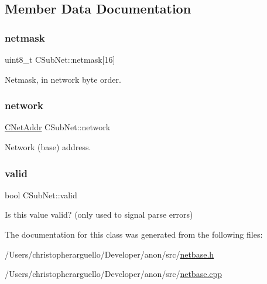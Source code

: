 \subsection{Member Data Documentation}
\mbox{\label{class_c_sub_net_a7ba6fc57a4ddcddfa3f3355cc3e56adc}} 
\subsubsection{\texorpdfstring{netmask}{netmask}}
{\footnotesize\ttfamily uint8\+\_\+t C\+Sub\+Net\+::netmask\mbox{[}16\mbox{]}\hspace{0.3cm}{\ttfamily [protected]}}



Netmask, in network byte order. 

\mbox{\label{class_c_sub_net_a17c8e899bfed76a371c833fb4cd679c9}} 
\subsubsection{\texorpdfstring{network}{network}}
{\footnotesize\ttfamily \mbox{\hyperlink{class_c_net_addr}{C\+Net\+Addr}} C\+Sub\+Net\+::network\hspace{0.3cm}{\ttfamily [protected]}}



Network (base) address. 

\mbox{\label{class_c_sub_net_a01fbc9843041de802baeaf4d6e4bbcc5}} 
\subsubsection{\texorpdfstring{valid}{valid}}
{\footnotesize\ttfamily bool C\+Sub\+Net\+::valid\hspace{0.3cm}{\ttfamily [protected]}}



Is this value valid? (only used to signal parse errors) 



The documentation for this class was generated from the following files\+:\begin{DoxyCompactItemize}
\item 
/\+Users/christopherarguello/\+Developer/anon/src/\mbox{\hyperlink{netbase_8h}{netbase.\+h}}\item 
/\+Users/christopherarguello/\+Developer/anon/src/\mbox{\hyperlink{netbase_8cpp}{netbase.\+cpp}}\end{DoxyCompactItemize}
